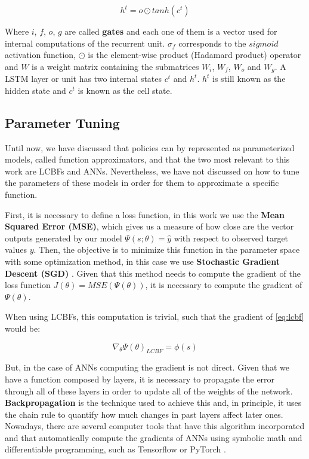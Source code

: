 \begin{equation}
    h^{t} = o \odot tanh(c^{t})
\end{equation}

Where $i$, $f$, $o$, $g$ are called \textbf{gates} and each one of them is a vector used for internal computations of the recurrent unit. $\sigma_{f}$ corresponds to the $sigmoid$ activation function, $\odot$ is the element-wise product (Hadamard product) operator and $W$ is a weight matrix containing the submatrices $W_{i}$, $W_{f}$, $W_{o}$ and $W_{g}$. A LSTM layer or unit has two internal states $c^{t}$ and $h^{t}$. $h^{t}$ is still known as the hidden state and $c^{t}$ is known as the cell state.

\subsection{Parameter Tuning}

Until now, we have discussed that policies can by represented as parameterized models, called function approximators, and that the two most relevant to this work are LCBFs and ANNs. Nevertheless, we have not discussed on how to tune the parameters of these models in order for them to approximate a specific function.

First, it is necessary to define a loss function, in this work we use the \textbf{Mean Squared Error (MSE)}, which gives us a measure of how close are the vector outputs generated by our model $\Psi(s;\theta)=\hat{y}$ with respect to observed target values $y$. Then, the objective is to minimize this function in the parameter space with some optimization method, in this case we use \textbf{Stochastic Gradient Descent (SGD)} \cite{robbins1951stochastic, saad1998online}. Given that this method needs to compute the gradient of the loss function $J(\theta)=MSE(\Psi(\theta))$, it is necessary to compute the gradient of $\Psi(\theta)$.

When using LCBFs, this computation is trivial, such that the gradient of \ref{eq:lcbf} would be:

\begin{equation}
    \nabla_{\theta} \Psi(\theta)_{LCBF} = \phi(s)
\end{equation}

But, in the case of ANNs computing the gradient is not direct. Given that we have a function composed by layers, it is necessary to propagate the error through all of these layers in order to update all of the weights of the network. \textbf{Backpropagation} \cite{rumelhart1988learning} is the technique used to achieve this and, in principle, it uses the chain rule to quantify how much changes in past layers affect later ones. Nowadays, there are several computer tools that have this algorithm incorporated and that automatically compute the gradients of ANNs using symbolic math and differentiable programming, such as Tensorflow \cite{tensorflow2015-whitepaper} or PyTorch \cite{paszke2017automatic}.

